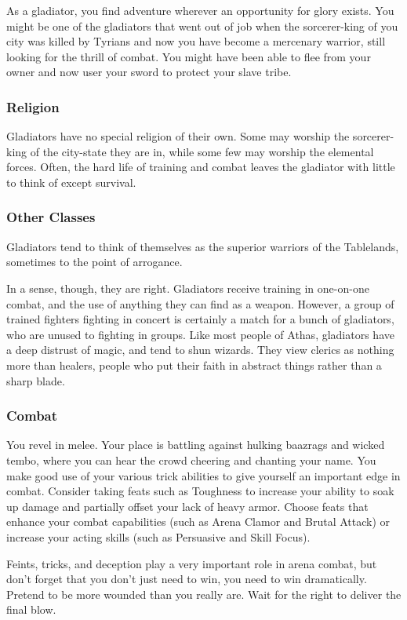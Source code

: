 As a gladiator, you find adventure wherever an opportunity for glory exists. You might be one of the gladiators that went out of job when the sorcerer-king of you city was killed by Tyrians and now you have become a mercenary warrior, still looking for the thrill of combat. You might have been able to flee from your owner and now user your sword to protect your slave tribe.

\subsubsection{Religion}
Gladiators have no special religion of their own. Some may worship the sorcerer-king of the city-state they are in, while some few may worship the elemental forces. Often, the hard life of training and combat leaves the gladiator with little to think of except survival.

\subsubsection{Other Classes}
Gladiators tend to think of themselves as the superior warriors of the Tablelands, sometimes to the point of arrogance.

In a sense, though, they are right. Gladiators receive training in one-on-one combat, and the use of anything they can find as a weapon. However, a group of trained fighters fighting in concert is certainly a match for a bunch of gladiators, who are unused to fighting in groups. Like most people of Athas, gladiators have a deep distrust of magic, and tend to shun wizards. They view clerics as nothing more than healers, people who put their faith in abstract things rather than a sharp blade.

\subsubsection{Combat}
You revel in melee. Your place is battling against hulking baazrags and wicked tembo, where you can hear the crowd cheering and chanting your name. You make good use of your various trick abilities to give yourself an important edge in combat. Consider taking feats such as Toughness to increase your ability to soak up damage and partially offset your lack of heavy armor. Choose feats that enhance your combat capabilities (such as Arena Clamor and Brutal Attack) or increase your acting skills (such as Persuasive and Skill Focus).

Feints, tricks, and deception play a very important role in arena combat, but don't forget that you don't just need to win, you need to win dramatically. Pretend to be more wounded than you really are. Wait for the right to deliver the final blow.

